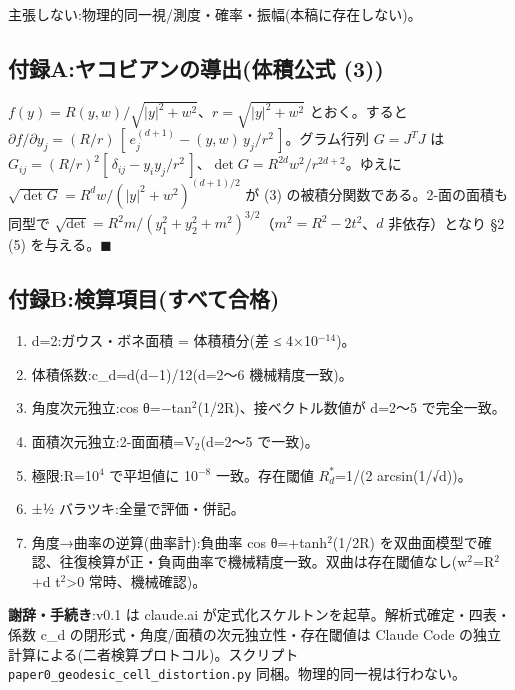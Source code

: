 \documentclass[
]{ltjsarticle}
\providecommand{\tightlist}{%
  \setlength{\itemsep}{0pt}\setlength{\parskip}{0pt}}
\begin{document}
主張しない:物理的同一視/測度・確率・振幅(本稿に存在しない)。

\subsection{付録A:ヤコビアンの導出(体積公式
(3))}\label{ux4ed8ux9332aux30e4ux30b3ux30d3ux30a2ux30f3ux306eux5c0eux51faux4f53ux7a4dux516cux5f0f-3}

\(f(y)=R(y,w)/\sqrt{|y|^2+w^2}\)、\(r=\sqrt{|y|^2+w^2}\) とおく。すると
\(\partial f/\partial y_j=(R/r)\,[\,e_j^{(d+1)} - (y,w)\,y_j/r^2\,]\)。グラム行列
\(G=J^{T}J\) は
\(G_{ij}=(R/r)^2[\,\delta_{ij} - y_i y_j/r^2\,]\)、\(\det G=R^{2d}w^2/r^{2d+2}\)。ゆえに
\(\sqrt{\det G}=R^{d}w/(|y|^2+w^2)^{(d+1)/2}\) が (3)
の被積分関数である。2-面の面積も同型で
\(\sqrt{\det}=R^2 m/(y_1^2+y_2^2+m^2)^{3/2}\)（\(m^2=R^2-2t^2\)、\(d\)
非依存）となり §2 (5) を与える。\(\blacksquare\)

\subsection{付録B:検算項目(すべて合格)}\label{ux4ed8ux9332bux691cux7b97ux9805ux76eeux3059ux3079ux3066ux5408ux683c}

\begin{enumerate}
\def\labelenumi{\arabic{enumi}.}
\tightlist
\item
  d=2:ガウス・ボネ面積 = 体積積分(差 ≤ 4×10\(^{-14}\))。
\item
  体積係数:c\_d=d(d−1)/12(d=2〜6 機械精度一致)。
\item
  角度次元独立:cos θ=−tan\(^{2}\)(1/2R)、接ベクトル数値が d=2〜5
  で完全一致。
\item
  面積次元独立:2-面面積=V\(_{2}\)(d=2〜5 で一致)。
\item
  極限:R=10\(^{4}\) で平坦値に 10\(^{-8}\) 一致。存在閾値
  \(R^{*}_{d}\)=1/(2 arcsin(1/√d))。
\item
  ±½ バラツキ:全量で評価・併記。
\item
  角度→曲率の逆算(曲率計):負曲率 cos θ=+tanh\(^{2}\)(1/2R)
  を双曲面模型で確認、往復検算が正・負両曲率で機械精度一致。双曲は存在閾値なし(w\(^{2}\)=R\(^{2}\)+d
  t\(^{2}\)\textgreater0 常時、機械確認)。
\end{enumerate}

\textbf{謝辞・手続き}:v0.1 は claude.ai
が定式化スケルトンを起草。解析式確定・四表・係数 c\_d
の閉形式・角度/面積の次元独立性・存在閾値は Claude Code
の独立計算による(二者検算プロトコル)。スクリプト
\texttt{paper0\_geodesic\_cell\_distortion.py}
同梱。物理的同一視は行わない。
\end{document}
